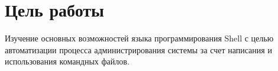 \thispagestyle{empty}
\section*{Цель работы}

Изучение основных  возможностей  языка программирования  Shell с целью автоматизации процесса администрирования системы за счет написания и использования командных файлов.